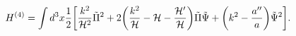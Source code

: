 \begin{equation}
H^{(4)} = \int d^3 x \frac{1}{2} \biggl[ \frac{k^2}{{\cal H}^2} \tilde{\Pi}^2 + 2 \biggl( \frac{k^2}{\cal H} - {\cal H} - 
\frac{{\cal H}'}{{\cal H}} \biggr) \tilde{\Pi} \tilde{\Psi}+ \biggl(k^2 - \frac{a''}{a}\biggr) \tilde{\Psi}^2 \biggr].
\end{equation}

